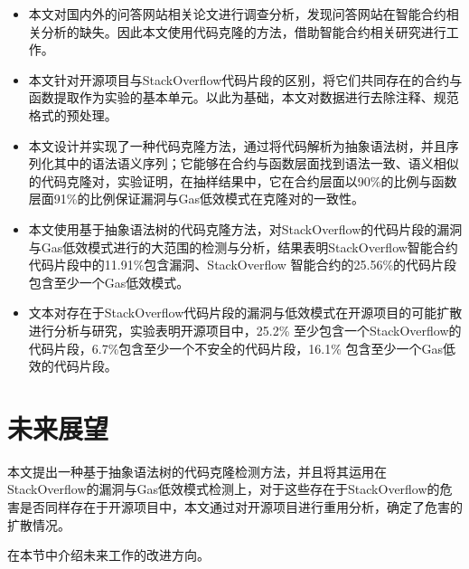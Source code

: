 \begin{itemize}
    \item 本文对国内外的问答网站相关论文进行调查分析，发现问答网站在智能合约相关分析的缺失。因此本文使用代码克隆的方法，借助智能合约相关研究进行工作。
    
    \item 本文针对开源项目与StackOverflow代码片段的区别，将它们共同存在的合约与函数提取作为实验的基本单元。以此为基础，本文对数据进行去除注释、规范格式的预处理。
    
    \item 本文设计并实现了一种代码克隆方法，通过将代码解析为抽象语法树，并且序列化其中的语法语义序列；它能够在合约与函数层面找到语法一致、语义相似的代码克隆对，实验证明，在抽样结果中，它在合约层面以90\%的比例与函数层面91\%的比例保证漏洞与Gas低效模式在克隆对的一致性。
    
    \item 本文使用基于抽象语法树的代码克隆方法，对StackOverflow的代码片段的漏洞与Gas低效模式进行的大范围的检测与分析，结果表明StackOverflow智能合约代码片段中的11.91\%包含漏洞、StackOverflow 智能合约的25.56\%的代码片段包含至少一个Gas低效模式。
    
    \item 文本对存在于StackOverflow代码片段的漏洞与低效模式在开源项目的可能扩散进行分析与研究，实验表明开源项目中，25.2\% 至少包含一个StackOverflow的代码片段，6.7\%包含至少一个不安全的代码片段，16.1\% 包含至少一个Gas低效的代码片段。
\end{itemize}
 

\section{未来展望}

本文提出一种基于抽象语法树的代码克隆检测方法，并且将其运用在StackOverflow的漏洞与Gas低效模式检测上，对于这些存在于StackOverflow的危害是否同样存在于开源项目中，本文通过对开源项目进行重用分析，确定了危害的扩散情况。

在本节中介绍未来工作的改进方向。

